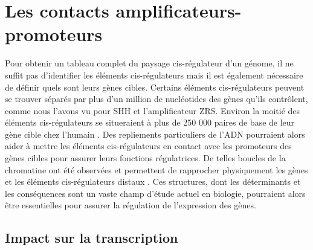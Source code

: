 \section{Les contacts \glspl{amplificateur}-promoteurs}
\label{sec:contact}

Pour obtenir un tableau complet du paysage \gls{cis}-régulateur d'un génome, il ne suffit pas d'identifier les éléments \gls{cis}-régulateurs mais il est également nécessaire de définir quels sont leurs gènes cibles. Certains éléments \gls{cis}-régulateurs peuvent se trouver séparés par plus d'un million de nucléotides des gènes qu’ils contrôlent, comme nous l’avons vu pour \acrshort{SHH} et l’\gls{amplificateur} \acrshort{ZRS}. Environ la moitié des éléments \gls{cis}-régulateurs se situeraient à plus de 250 000 paires de base de leur gène cible chez l’humain \citep{montavon_regulatory_2011}. Des repliements particuliers de l’ADN pourraient  alors aider à mettre les éléments \gls{cis}-régulateurs en contact avec les promoteurs des gènes cibles pour assurer leurs fonctions régulatrices. De telles boucles de la chromatine ont été observées et permettent de rapprocher physiquement les gènes et les éléments \gls{cis}-régulateurs distaux \citep{tolhuis_looping_2002}. Ces structures, dont les déterminants et les conséquences sont un vaste champ d'étude actuel en biologie, pourraient alors être essentielles pour assurer la régulation de l’expression des gènes.

\subsection{Impact sur la transcription}
\label{subsec:impact-transcription}

